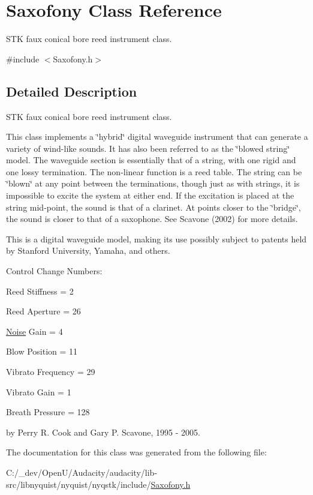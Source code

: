 \hypertarget{class_saxofony}{}\section{Saxofony Class Reference}
\label{class_saxofony}


S\+TK faux conical bore reed instrument class.  




{\ttfamily \#include $<$Saxofony.\+h$>$}



\subsection{Detailed Description}
S\+TK faux conical bore reed instrument class. 

This class implements a \char`\"{}hybrid\char`\"{} digital waveguide instrument that can generate a variety of wind-\/like sounds. It has also been referred to as the \char`\"{}blowed string\char`\"{} model. The waveguide section is essentially that of a string, with one rigid and one lossy termination. The non-\/linear function is a reed table. The string can be \char`\"{}blown\char`\"{} at any point between the terminations, though just as with strings, it is impossible to excite the system at either end. If the excitation is placed at the string mid-\/point, the sound is that of a clarinet. At points closer to the \char`\"{}bridge\char`\"{}, the sound is closer to that of a saxophone. See Scavone (2002) for more details.

This is a digital waveguide model, making its use possibly subject to patents held by Stanford University, Yamaha, and others.

Control Change Numbers\+:
\begin{DoxyItemize}
\item Reed Stiffness = 2
\item Reed Aperture = 26
\item \hyperlink{class_noise}{Noise} Gain = 4
\item Blow Position = 11
\item Vibrato Frequency = 29
\item Vibrato Gain = 1
\item Breath Pressure = 128
\end{DoxyItemize}

by Perry R. Cook and Gary P. Scavone, 1995 -\/ 2005. 

The documentation for this class was generated from the following file\+:\begin{DoxyCompactItemize}
\item 
C\+:/\+\_\+dev/\+Open\+U/\+Audacity/audacity/lib-\/src/libnyquist/nyquist/nyqstk/include/\hyperlink{_saxofony_8h}{Saxofony.\+h}\end{DoxyCompactItemize}
